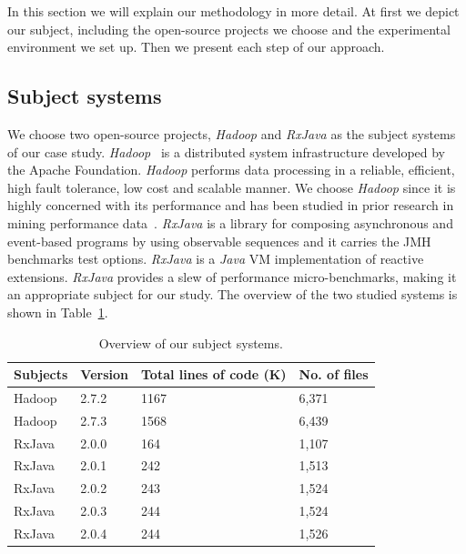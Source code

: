 In this section we will explain our methodology in more detail. At first we depict our subject, including the open-source projects we choose and the experimental environment we set up. Then we present each step of our approach.

\subsection{Subject systems}
We choose two open-source projects, \emph{Hadoop} and \emph{RxJava} as the subject systems of our case study. 
\emph{Hadoop}~\cite{hadoop2012:White} is a distributed system infrastructure developed by the Apache Foundation. \emph{Hadoop} performs data processing in a reliable, efficient, high fault tolerance, low cost and scalable manner. We choose \emph{Hadoop} since it is highly concerned with its performance and has been studied in prior research in mining performance data~\cite{markASE}. \emph{RxJava} is a library for composing asynchronous and event-based programs by using observable sequences and it carries the JMH benchmarks test options. \emph{RxJava} is a \emph{Java} VM implementation of reactive extensions. \emph{RxJava} provides a slew of performance micro-benchmarks, making it an appropriate subject for our study. The overview of the two studied systems is shown in Table~\ref{tab:subject}. 

 \begin{table}[tbh]
 	\centering
 	\small
	\caption{Overview of our subject systems.}
	\label{tab:subject}
	 	\begin{tabular}{llll}
 		\hline
 		Subjects&Version&Total lines of code (K)& No. of files \\\hline
 		Hadoop& 2.7.2              &1167      & 6,371     \\ 
 		Hadoop& 2.7.3			&1568		&6,439		\\\hline
 		RxJava&  2.0.0           & 164       & 1,107         \\ 
 		RxJava&  2.0.1			 &242		 &1,513		\\
 		RxJava&  2.0.2			&243			&1,524	\\
 		RxJava&  2.0.3			&244			&1,524	\\
 		RxJava&  2.0.4			&244			&1,526	\\\hline
 	\end{tabular}

\end{table}

